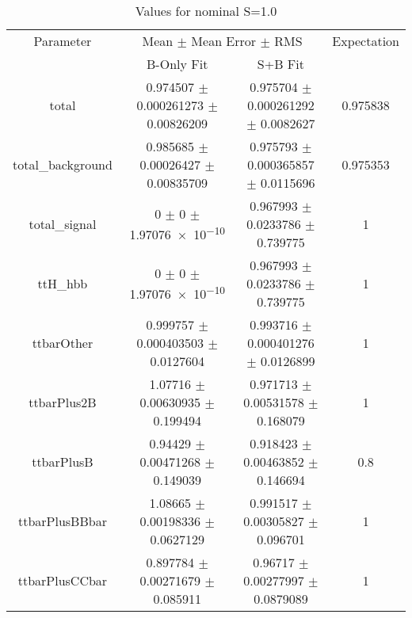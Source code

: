 \begin{table}
\centering
\caption{Values for nominal S=1.0}
\begin{tabular}{cccc}
\toprule
Parameter & \multicolumn{2}{c}{Mean $\pm$ Mean Error $\pm$ RMS} & Expectation\\
 & B-Only Fit & S+B Fit & \\
\midrule
total & \num{0.974507} $\pm$ \num{0.000261273} $\pm$ \num{0.00826209} & \num{0.975704} $\pm$ \num{0.000261292} $\pm$ \num{0.0082627} & \num{0.975838}\\
total\_background & \num{0.985685} $\pm$ \num{0.00026427} $\pm$ \num{0.00835709} & \num{0.975793} $\pm$ \num{0.000365857} $\pm$ \num{0.0115696} & \num{0.975353}\\
total\_signal & \num{0} $\pm$ \num{0} $\pm$ \num{1.97076e-10} & \num{0.967993} $\pm$ \num{0.0233786} $\pm$ \num{0.739775} & \num{1}\\
ttH\_hbb & \num{0} $\pm$ \num{0} $\pm$ \num{1.97076e-10} & \num{0.967993} $\pm$ \num{0.0233786} $\pm$ \num{0.739775} & \num{1}\\
ttbarOther & \num{0.999757} $\pm$ \num{0.000403503} $\pm$ \num{0.0127604} & \num{0.993716} $\pm$ \num{0.000401276} $\pm$ \num{0.0126899} & \num{1}\\
ttbarPlus2B & \num{1.07716} $\pm$ \num{0.00630935} $\pm$ \num{0.199494} & \num{0.971713} $\pm$ \num{0.00531578} $\pm$ \num{0.168079} & \num{1}\\
ttbarPlusB & \num{0.94429} $\pm$ \num{0.00471268} $\pm$ \num{0.149039} & \num{0.918423} $\pm$ \num{0.00463852} $\pm$ \num{0.146694} & \num{0.8}\\
ttbarPlusBBbar & \num{1.08665} $\pm$ \num{0.00198336} $\pm$ \num{0.0627129} & \num{0.991517} $\pm$ \num{0.00305827} $\pm$ \num{0.096701} & \num{1}\\
ttbarPlusCCbar & \num{0.897784} $\pm$ \num{0.00271679} $\pm$ \num{0.085911} & \num{0.96717} $\pm$ \num{0.00277997} $\pm$ \num{0.0879089} & \num{1}\\
\bottomrule
\end{tabular}
\end{table}